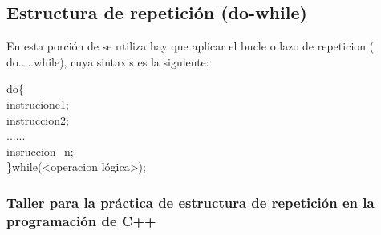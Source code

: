 \documentclass[a4paper,12pt,spanish]{article}
\begin{document}
\newpage
\restoregeometry

\subsection{Estructura de repetición (do-while)
}


En esta porción de se utiliza hay que aplicar el  bucle o lazo de repeticion ( do{.....}while), cuya sintaxis es la siguiente:

    \begin{tcolorbox}[title=''Sintaxis de un do{...}while(..);'']
      do\{\\
        instrucione1;\\
        instruccion2;\\
        ......\\
        insruccion\_n;\\
       \}while(<operacion lógica>);
    \end{tcolorbox}

    \newpage
\subsubsection{Taller para la práctica de  estructura de repetición en la programación de C++}
\end{document}
